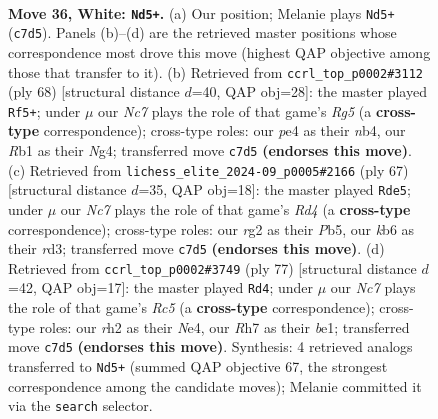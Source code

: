 \documentclass[11pt]{article}
\begin{document}
\clearpage

\begin{figure}[p]\centering
\begin{subfigure}{0.46\textwidth}\centering
\resizebox{\linewidth}{!}{%
\newchessgame
\chessboard[
  setfen={8/ppN4R/1k6/2p2p1P/4p3/8/PP4rr/1R1K4 w - - 3 36},
  showmover=false,
  pgfstyle=straightmove, color=movearrow, markmove={c7-d5}
]}
\caption{}
\end{subfigure}\hfill
\begin{subfigure}{0.46\textwidth}\centering
\resizebox{\linewidth}{!}{%
\newchessgame
\chessboard[
  setfen={3rr3/p3pk2/8/p2P2R1/1n4N1/8/1P3K2/3R4 w - - 1 35},
  showmover=false,
  pgfstyle=straightmove, color=movearrow, markmove={g5-f5}
]}
\caption{}
\end{subfigure}
\\[4pt]
\begin{subfigure}{0.46\textwidth}\centering
\resizebox{\linewidth}{!}{%
\newchessgame
\chessboard[
  setfen={1k2r3/8/p7/1p1r4/8/P2R2P1/1PPKp3/4R3 b - - 3 34},
  showmover=false,
  pgfstyle=straightmove, color=movearrow, markmove={d5-e5}
]}
\caption{}
\end{subfigure}\hfill
\begin{subfigure}{0.46\textwidth}\centering
\resizebox{\linewidth}{!}{%
\newchessgame
\chessboard[
  setfen={8/8/2p1r1k1/4pR1p/2r1n3/PK5P/1P4P1/4BR2 b - - 3 39},
  showmover=false,
  pgfstyle=straightmove, color=movearrow, markmove={c4-d4}
]}
\caption{}
\end{subfigure}
\caption{\textbf{Move 36, White: \texttt{Nd5+}.} (a) Our position; Melanie plays \texttt{Nd5+} (\texttt{c7d5}). Panels (b)--(d) are the retrieved master positions whose correspondence most drove this move (highest QAP objective among those that transfer to it). (b) Retrieved from \texttt{ccrl\_top\_p0002\#3112} (ply 68) [structural distance $d$=40, QAP obj=28]: the master played \texttt{Rf5+}; under $\mu$ our \emph{Nc7} plays the role of that game's \emph{Rg5} (a \textbf{cross-type} correspondence); cross-type roles: our \emph{p}e4 as their \emph{n}b4, our \emph{R}b1 as their \emph{N}g4; transferred move \texttt{c7d5} \textbf{(endorses this move)}. (c) Retrieved from \texttt{lichess\_elite\_2024-09\_p0005\#2166} (ply 67) [structural distance $d$=35, QAP obj=18]: the master played \texttt{Rde5}; under $\mu$ our \emph{Nc7} plays the role of that game's \emph{Rd4} (a \textbf{cross-type} correspondence); cross-type roles: our \emph{r}g2 as their \emph{P}b5, our \emph{k}b6 as their \emph{r}d3; transferred move \texttt{c7d5} \textbf{(endorses this move)}. (d) Retrieved from \texttt{ccrl\_top\_p0002\#3749} (ply 77) [structural distance $d$=42, QAP obj=17]: the master played \texttt{Rd4}; under $\mu$ our \emph{Nc7} plays the role of that game's \emph{Rc5} (a \textbf{cross-type} correspondence); cross-type roles: our \emph{r}h2 as their \emph{N}e4, our \emph{R}h7 as their \emph{b}e1; transferred move \texttt{c7d5} \textbf{(endorses this move)}. Synthesis: 4 retrieved analogs transferred to \texttt{Nd5+} (summed QAP objective 67, the strongest correspondence among the candidate moves); Melanie committed it via the \texttt{search} selector.}
\label{fig:thought-m70}
\end{figure}
\end{document}
